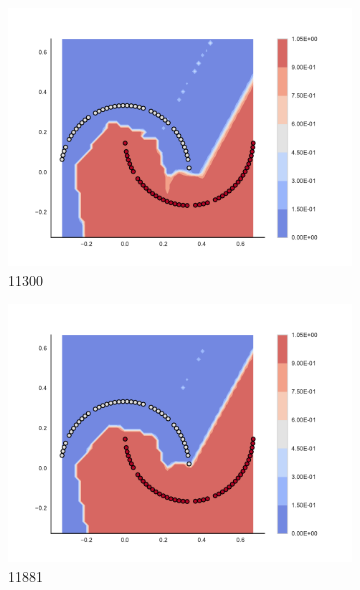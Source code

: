 \begin{figure}[h]
\begin{subfigure}[b]{0.09\textwidth}
    \includegraphics[clip, trim=2.35cm 1.75cm 4.5cm 0cm,width=\textwidth]{img/convergence/11300.pdf}
    \caption{11300}
    \label{fig:convergence_11300}
\end{subfigure}
%
\begin{subfigure}[b]{0.09\textwidth}
    \includegraphics[clip, trim=2.35cm 1.75cm 4.5cm 0cm,width=\textwidth]{img/convergence/11881.pdf}
    \caption{11881}
    \label{fig:convergence_11881}
\end{subfigure}
%
\begin{subfigure}[b]{0.09\textwidth}

\end{subfigure}
\end{figure}
